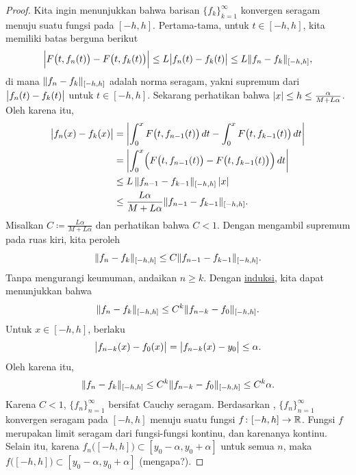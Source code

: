 \begin{proof}
Kita ingin menunjukkan bahwa barisan $\{ f_k \}_{k=1}^\infty$ konvergen seragam
menuju suatu fungsi pada $[-h,h]$.  Pertama-tama, untuk $t \in [-h,h]$,
kita memiliki batas berguna
berikut
\begin{equation*}
\Bigl\lvert {F\bigl(t,f_{n}(t)\bigr) - 
F\bigl(t,f_{k}(t)\bigr)} \Bigr\rvert
\leq
L \bigl\lvert {f_n(t)-f_k(t)} \bigr\rvert
\leq
L \lVert {f_n-f_k} \rVert_{[-h,h]} ,
\end{equation*}
di mana $\lVert {f_n-f_k} \rVert_{[-h,h]}$ adalah norma seragam,
yakni supremum dari $\bigl\lvert {f_n(t)-f_k(t)} \bigr\rvert$ untuk $t \in [-h,h]$.
Sekarang perhatikan bahwa $\lvert {x} \rvert \leq h \leq \frac{\alpha}{M+L\alpha}$.
Oleh karena itu,
\begin{equation*}
\begin{split}
\bigl\lvert {f_n(x) - f_k(x)} \bigr\rvert
& =
\left\lvert {\int_{0}^x F\bigl(t,f_{n-1}(t)\bigr)\,dt 
-
\int_{0}^x F\bigl(t,f_{k-1}(t)\bigr)\,dt} \right\rvert
\\
& =
\left\lvert {\int_{0}^x
\Bigl(
F\bigl(t,f_{n-1}(t)\bigr)-
F\bigl(t,f_{k-1}(t)\bigr)
\Bigr)
\,dt} \right\rvert
\\
& \leq
L
\,
\lVert {f_{n-1}-f_{k-1}} \rVert_{[-h,h]}
\,
\lvert {x} \rvert
\\
& \leq
\frac{L\alpha}{M+L\alpha}
\lVert {f_{n-1}-f_{k-1}} \rVert_{[-h,h]} .
\end{split}
\end{equation*}
Misalkan $C \coloneqq \frac{L\alpha}{M+L\alpha}$ dan perhatikan bahwa $C < 1$.
Dengan mengambil supremum pada ruas kiri, kita peroleh
\begin{equation*}
\lVert {f_n-f_k} \rVert_{[-h,h]} \leq C \lVert {f_{n-1}-f_{k-1}} \rVert_{[-h,h]} .
\end{equation*}
Tanpa mengurangi keumuman,
andaikan $n \geq k$.  Dengan \hyperref[induction:thm]{induksi}, kita dapat menunjukkan bahwa
\begin{equation*}
\lVert {f_n-f_k} \rVert_{[-h,h]} \leq C^{k} \lVert {f_{n-k}-f_{0}} \rVert_{[-h,h]} .
\end{equation*}
Untuk $x \in [-h,h]$, berlaku
\begin{equation*}
\bigl\lvert {f_{n-k}(x)-f_{0}(x)} \bigr\rvert
=
\bigl\lvert {f_{n-k}(x)-y_0} \bigr\rvert
\leq \alpha .
\end{equation*}
Oleh karena itu,
\begin{equation*}
\lVert {f_n-f_k} \rVert_{[-h,h]} \leq C^{k} \lVert {f_{n-k}-f_{0}} \rVert_{[-h,h]} \leq C^{k} \alpha .
\end{equation*}
Karena $C < 1$, $\{f_n\}_{n=1}^\infty$ bersifat Cauchy seragam.
Berdasarkan , $\{ f_n \}_{n=1}^\infty$
konvergen seragam pada $[-h,h]$ menuju suatu fungsi $f \colon [-h,h] \to {\mathbb{R}}$.
Fungsi $f$ merupakan limit seragam dari fungsi-fungsi kontinu, dan karenanya
kontinu.  Selain itu, karena $f_n\bigl([-h,h]\bigr) \subset
[y_0-\alpha,y_0+\alpha]$ untuk semua $n$,
maka $f\bigl([-h,h]\bigr) \subset [y_0-\alpha,y_0+\alpha]$
(mengapa?).



\end{proof}
